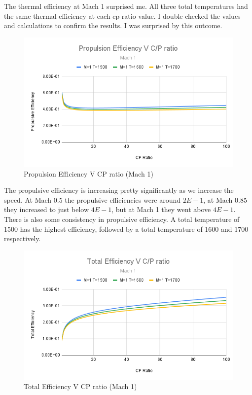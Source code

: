 \documentclass[12pt]{report}
\begin{document}
The thermal efficiency at Mach 1 surprised me. All three total temperatures had the same thermal efficiency at each cp ratio value. I double-checked the values and calculations to confirm the results. I was surprised by this outcome.



\begin{figure}[H]
    \centering
    \includegraphics[width=15.5 cm]{Propulsion Efficiency V C_P ratio (Mach 0.1).png}
    \caption{Propulsion Efficiency V CP ratio (Mach 1)}
    \label{fig: Propulsion Efficiency V CP ratio (Mach 1)}
\end{figure}



The propulsive efficiency is increasing pretty significantly as we increase the speed.  At Mach 0.5 the propulsive efficiencies were around $2E-1$, at Mach 0.85 they increased to just below $4E-1$, but at Mach 1 they went above $4E-1$. There is also some consistency in propulsive efficiency.  A total temperature of 1500 has the highest efficiency, followed by a total temperature of 1600 and 1700 respectively.




\begin{figure}[H]
    \centering
    \includegraphics[width=15.5 cm]{Total Efficiency V C_P ratio (Mach 0.1).png}
    \caption{Total Efficiency V CP ratio (Mach 1)}
    \label{fig:Total Efficiency V CP ratio (Mach 1)}
\end{figure}
\end{document}
